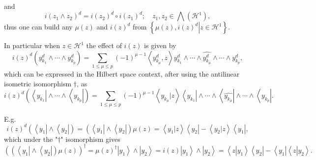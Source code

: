 \documentclass[aps,preprint]{revtex4}%
\begin{document}
and
\begin{equation}
i\left(  z_{1}\wedge z_{2}\right)  ^{d}=i\left(  z_{2}\right)  ^{d}\circ
i\left(  z_{1}\right)  ^{d};\quad z_{1},z_{2}\in%
{\textstyle\bigwedge}
\left(  \mathcal{H}^{1}\right)  ,
\end{equation}
thus one can build any $\mu\left(  z\right)  $ and $i\left(  z\right)  ^{d}$
from $\left\{  \left.  \mu\left(  z\right)  ,i\left(  z\right)  ^{d}%
\right\vert z\in\mathcal{H}^{1}\right\}  .$

In particular when $z\in\mathcal{H}^{1}$ the effect of $i\left(  z\right)  $
is given by
\begin{equation}
i\left(  z\right)  ^{d}\left(  y_{k_{1}}^{d}\wedge\cdots\wedge y_{k_{p}}%
^{d}\right)  =\sum_{1\leq\mu\leq p}\left(  -1\right)  ^{\mu-1}\left\langle
y_{k_{\mu}}^{d},z\right\rangle y_{k_{1}}^{d}\wedge\cdots\wedge
\widehat{y_{k_{\mu}}^{d}}\wedge\cdots\wedge y_{k_{p}}^{d},
\end{equation}
which can be expressed in the Hilbert space context, after using the
antilinear isometric isomorphism $\dagger$, as
\begin{equation}
i\left(  z\right)  ^{d}\left(  \left\langle y_{k_{1}}\right\vert \wedge
\cdots\wedge\left\langle y_{k_{p}}\right\vert \right)  =\sum_{1\leq\mu\leq
p}\left(  -1\right)  ^{\mu-1}\left\langle y_{k_{\mu}}\left\vert z\right.
\right\rangle \left\langle y_{k_{1}}\right\vert \wedge\cdots\wedge\left\langle
\widehat{y_{k_{\mu}}}\right\vert \wedge\cdots\wedge\left\langle y_{k_{p}%
}\right\vert .
\end{equation}


E.g.%
\begin{equation}
i\left(  z\right)  ^{d}\left(  \left\langle y_{1}\right\vert \wedge
\left\langle y_{2}\right\vert \right)  =\left(  \left\langle y_{1}\right\vert
\wedge\left\langle y_{2}\right\vert \right)  \mu\left(  z\right)
=\left\langle y_{1}\left\vert z\right.  \right\rangle \left\langle
y_{2}\right\vert -\left\langle y_{2}\left\vert z\right.  \right\rangle
\left\langle y_{1}\right\vert ,
\end{equation}
which under the "$\dagger$" isomorphism gives
\begin{equation}
\left(  \left(  \left\langle y_{1}\right\vert \wedge\left\langle
y_{2}\right\vert \right)  \mu\left(  z\right)  \right)  ^{\dagger}=\mu\left(
z\right)  ^{\dagger}\left\vert y_{1}\right\rangle \wedge\left\vert
y_{2}\right\rangle =i\left(  z\right)  \left\vert y_{1}\right\rangle
\wedge\left\vert y_{2}\right\rangle =\left\langle z\left\vert y_{1}\right.
\right\rangle \left\langle y_{2}\right\vert -\left\langle y_{1}\right\vert
\left\langle z\left\vert y_{2}\right.  \right\rangle .
\end{equation}
\end{document}
